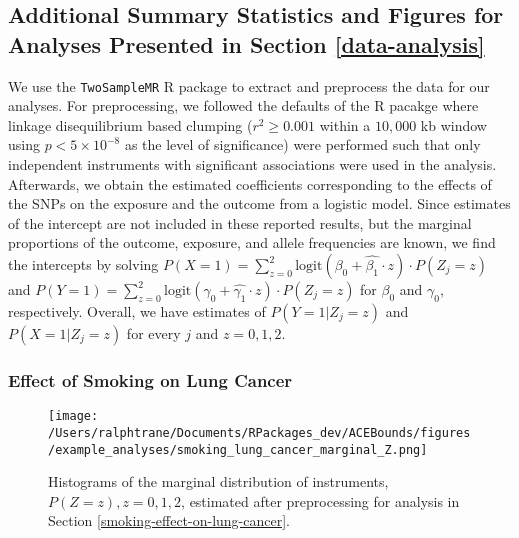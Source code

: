 \documentclass[
]{article}
\theoremstyle{plain}
\begin{document}
\hypertarget{additional-summary-statistics-and-figures-for-analyses-presented-in-section}{%
\subsection{\texorpdfstring{Additional Summary Statistics and Figures for Analyses Presented in Section \ref{data-analysis} \label{more-details-data-application-appendix}}{Additional Summary Statistics and Figures for Analyses Presented in Section  }}\label{additional-summary-statistics-and-figures-for-analyses-presented-in-section}}

We use the \texttt{TwoSampleMR} R package \autocite{mrbase} to extract and preprocess the data for our analyses. For preprocessing, we followed the defaults of the R pacakge where linkage disequilibrium based clumping (\(r^2 \ge 0.001\) within a \(10,000\) kb window using \(p < 5 \times 10^{-8}\) as the level of significance) were performed such that only independent instruments with significant associations were used in the analysis. Afterwards, we obtain the estimated coefficients corresponding to the effects of the SNPs on the exposure and the outcome from a logistic model. Since estimates of the intercept are not included in these reported results, but the marginal proportions of the outcome, exposure, and allele frequencies are known, we find the intercepts by solving \(P(X = 1) = \sum_{z = 0}^2\text{logit}(\beta_0 + \hat{\beta_1}\cdot z)\cdot P(Z_j = z)\) and \(P(Y = 1) = \sum_{z = 0}^2\text{logit}(\gamma_0 + \hat{\gamma_1}\cdot z)\cdot P(Z_j = z)\) for \(\beta_0\) and \(\gamma_0\), respectively. Overall, we have estimates of \(P(Y = 1 | Z_j = z)\) and \(P(X = 1 | Z_j = z)\) for every \(j\) and \(z=0,1,2\).

\hypertarget{effect-of-smoking-on-lung-cancer}{%
\subsubsection{\texorpdfstring{Effect of Smoking on Lung Cancer \label{appendix:smoking-on-lung-cancer}}{Effect of Smoking on Lung Cancer }}\label{effect-of-smoking-on-lung-cancer}}

\begin{figure}[H]
  \center
  \texttt{[image: /Users/ralphtrane/Documents/RPackages\_dev/ACEBounds/figures/example\_analyses/smoking\_lung\_cancer\_marginal\_Z.png]}
  \caption{Histograms of the marginal distribution of instruments, $P(Z = z), z=0,1,2$, estimated after preprocessing for analysis in Section \ref{smoking-effect-on-lung-cancer}.}
  \label{fig:marginal-distribution-of-instruments-lung-cancer}
\end{figure}
\end{document}
